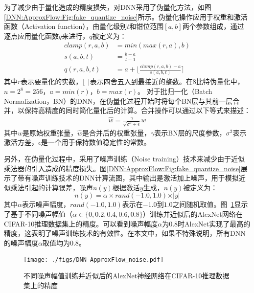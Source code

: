 为了减少由于量化造成的精度损失，对DNN采用了伪量化方法\cite{DNN:fake_quanti}，如图\ref{DNN:ApproxFlow:Fig:fake_quantize_noise}所示。伪量化操作应用于权重和激活函数（Activation function），由量化级别$t$和钳位范围$[a,b]$两个参数组成，通过逐点应用量化函数$q$来进行，$q$被定义为：
\begin{align}
    clamp(r, a, b) &= min(max(r, a), b) \\
    s(a, b, t)     &= \frac{b - a}{t - 1} \\
    q(r, a, b, t)  &= a + \lfloor \frac{clamp(r, a, b) - a}{s(a, b, t)} \rceil
\label{DNN:ApproxFlow:Eq:fake_quantize}
\end{align}
其中$r$表示要量化的实数，$\lfloor \ \rceil$表示四舍五入到最接近的整数。在8比特伪量化中，$n=2^8=256$，$a=min(r)$，$b=max(r)$。
对于批归一化（Batch Normalization，BN）的DNN，在伪量化过程开始时将每个BN层与其前一层合并，以保持高精度的同时简化量化后的计算。合并操作可以通过以下等式来描述：
\begin{equation}
    \label{DNN:ApproxFlow:Eq:BN}
    \begin{aligned}
    \hat{w} = \frac{\gamma}{\sqrt{\sigma^2 + \epsilon}} w
    \end{aligned}
\end{equation}
其中$w$是原始权重张量，$\hat{w}$是合并后的权重张量，$\gamma$表示BN层的尺度参数，$\sigma ^2$表示激活方差，$\epsilon$是一个用于保持数值稳定性的常数。

另外，在伪量化\cite{DNN:fake_quanti}过程中，采用了噪声训练（Noise training）技术来减少由于近似乘法器的引入造成的精度损失。图\ref{DNN:ApproxFlow:Fig:fake_quantize_noise}展示了带有噪声训练技术的DNN计算流图，其中输出是激活加上噪声，用于模拟近似乘法引起的计算误差，噪声$n(y)$根据激活$y$生成，$n(y)$被定义为：
\begin{equation}
    \label{DNN:ApproxFlow:Eq:noise}
    n(y) = \alpha \times rand(-1.0, 1.0) \times \vert y \vert
\end{equation}
其中$\alpha$表示噪声幅度，$rand(-1.0,1.0)$表示在$-1.0$到$1.0$之间随机取值。图~\ref{DNN:ApproxFlow:Fig:noise}显示了基于不同噪声幅值（$\alpha \in \{0,0.2,0.4,0.6,0.8\}$）训练并近似后的AlexNet网络\cite{DNN:AlexNet}在CIFAR-10\cite{DNN:CIFAR-10}推理数据集上的精度。可以看到噪声幅度$\alpha$为0.8时AlexNet实现了最高的精度，这表明了噪声训练技术的有效性。在本文中，如果不特殊说明，所有DNN的噪声幅度$\alpha$取值均为$0.8$。
\begin{figure}[!ht]
    \centering
    \texttt{[image: ./figs/DNN-ApproxFlow\_noise.pdf]}
    \caption{不同噪声幅值训练并近似后的AlexNet神经网络在CIFAR-10推理数据集上的精度}
    \label{DNN:ApproxFlow:Fig:noise}
\end{figure}

